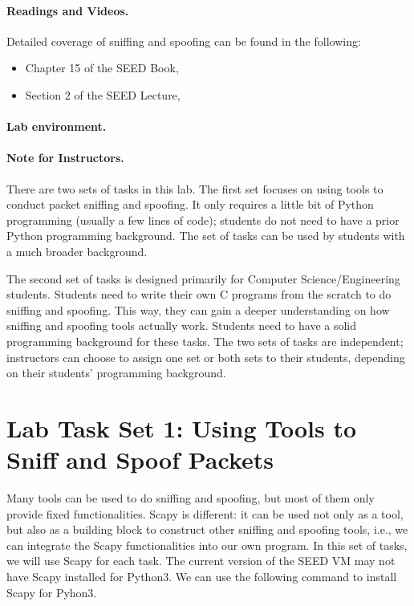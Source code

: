 \paragraph{Readings and Videos.}
Detailed coverage of sniffing and spoofing can be found in
the following:

\begin{itemize}
\item Chapter 15 of the SEED Book, \seedbook

\item Section 2 of the SEED Lecture, \seedisvideo
\end{itemize}



\paragraph{Lab environment.} \seedenvironment



\paragraph{Note for Instructors.}
There are two sets of tasks in this lab. The first set focuses on using 
tools to conduct packet sniffing and spoofing. It only requires a
little bit of Python programming (usually a few lines of code); students do
not need to have a prior Python programming background. 
The set of tasks can be used by students with a much broader background.

The second set of tasks is designed primarily for Computer Science/Engineering students.
Students need to write their own C programs from the scratch to do sniffing 
and spoofing. This way, they can gain a deeper understanding 
on how sniffing and spoofing tools actually work. Students 
need to have a solid programming background for these tasks.
The two sets of tasks are independent; instructors can choose to
assign one set or both sets to their students, depending on 
their students' programming background.



\section{Lab Task Set 1: Using Tools to Sniff and Spoof Packets}


Many tools can be used to do sniffing and spoofing, but most of them only provide 
fixed functionalities. Scapy is different: it can be used not only as a tool, 
but also as a building block to construct other sniffing and spoofing
tools, i.e., we can integrate the Scapy functionalities into our own
program.  In this set of tasks, we will use Scapy for each task. 
The current version of the SEED VM may not have Scapy installed for Python3. 
We can use the following command to install Scapy for Pyhon3.

